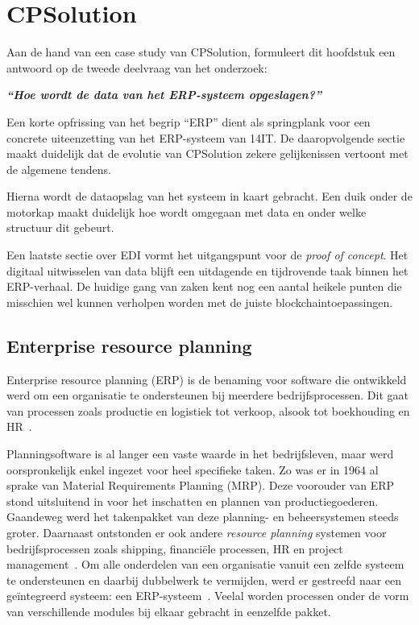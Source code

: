 \chapter{CPSolution}
\label{ch:cpsolution}

Aan de hand van een case study van CPSolution, formuleert dit hoofdstuk een antwoord op de tweede deelvraag van het onderzoek:

\begin{center}
	\textit{\textbf{``Hoe wordt de data van het ERP-systeem opgeslagen?''}}
\end{center}

Een korte opfrissing van het begrip ``ERP'' dient als springplank voor een concrete uiteenzetting van het ERP-systeem van 14IT. De daaropvolgende sectie maakt duidelijk dat de evolutie van CPSolution zekere gelijkenissen vertoont met de algemene tendens. 

Hierna wordt de dataopslag van het systeem in kaart gebracht. Een duik onder de motorkap maakt duidelijk hoe wordt omgegaan met data en onder welke structuur dit gebeurt. 

Een laatste sectie over EDI vormt het uitgangspunt voor de \textit{proof of concept}. Het digitaal uitwisselen van data blijft een uitdagende en tijdrovende taak binnen het ERP-verhaal. De huidige gang van zaken kent nog een aantal heikele punten die misschien wel kunnen verholpen worden met de juiste blockchaintoepassingen.


\section{Enterprise resource planning}
\label{sec:enterprise-resource-planning}

Enterprise resource planning (ERP) is de benaming voor software die ontwikkeld werd om een organisatie te ondersteunen bij meerdere bedrijfsprocessen. Dit gaat van processen zoals productie en logistiek tot verkoop, alsook tot boekhouding en HR~\autocite{Shehab2004}. 

Planningsoftware is al langer een vaste waarde in het bedrijfsleven, maar werd oorspronkelijk enkel ingezet voor heel specifieke taken. Zo was er in 1964 al sprake van Material Requirements Planning (MRP). Deze voorouder van ERP stond uitsluitend in voor het inschatten en plannen van productiegoederen. Gaandeweg werd het takenpakket van deze planning- en beheersystemen steeds groter. Daarnaast ontstonden er ook andere \textit{resource planning} systemen voor bedrijfsprocessen zoals shipping, financiële processen, HR en project management~\autocite{Antjon2021}. Om alle onderdelen van een organisatie vanuit een zelfde systeem te ondersteunen en daarbij dubbelwerk te vermijden, werd er gestreefd naar een geïntegreerd systeem: een ERP-systeem~\autocite{Verbeiren2020}. Veelal worden processen onder de vorm van verschillende modules bij elkaar gebracht in eenzelfde pakket.

